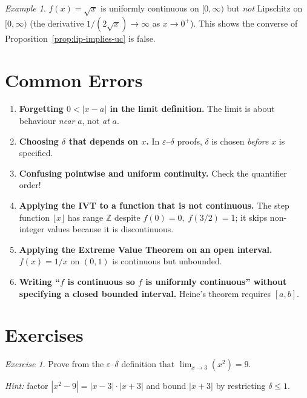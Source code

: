 \documentclass[12pt,a4paper,openany]{book}
\theoremstyle{definition}
\theoremstyle{remark}
\newtheorem{example}{Example}[chapter]
\newtheorem{exercise}{Exercise}[chapter]
\begin{document}
\begin{example}
$f(x)=\sqrt{x}$ is uniformly continuous on $[0,\infty)$ but \emph{not}
Lipschitz on $[0,\infty)$ (the derivative $1/(2\sqrt{x})\to\infty$ as
$x\to 0^+$).  This shows the converse of
Proposition~\ref{prop:lip-implies-uc} is false.
\end{example}

\section{Common Errors}

\begin{tcolorbox}[colback=red!4,colframe=red!70!black,
  title={Frequent mistakes in Chapter~5}]
\begin{enumerate}[nosep]
\item \textbf{Forgetting $0<|x-a|$ in the limit definition.}\;
  The limit is about behaviour \emph{near} $a$, not \emph{at} $a$.
\item \textbf{Choosing $\delta$ that depends on $x$.}\;
  In $\varepsilon$--$\delta$ proofs, $\delta$ is chosen \emph{before}
  $x$ is specified.
\item \textbf{Confusing pointwise and uniform continuity.}\;
  Check the quantifier order!
\item \textbf{Applying the IVT to a function that is not continuous.}\;
  The step function $\lfloor x\rfloor$ has range $\mathbb{Z}$ despite
  $f(0)=0,\;f(3/2)=1$; it skips non-integer values because it is
  discontinuous.
\item \textbf{Applying the Extreme Value Theorem on an open interval.}\;
  $f(x)=1/x$ on $(0,1)$ is continuous but unbounded.
\item \textbf{Writing ``$f$ is continuous so $f$ is uniformly
  continuous'' without specifying a closed bounded interval.}\;
  Heine's theorem requires $[a,b]$.
\end{enumerate}
\end{tcolorbox}

\section{Exercises}

\begin{exercise}\label{exo:ch5-1}
Prove from the $\varepsilon$--$\delta$ definition that
$\displaystyle\lim_{x\to 3}(x^2)=9$.

\emph{Hint:} factor $|x^2-9|=|x-3|\cdot|x+3|$ and bound $|x+3|$
by restricting $\delta\le 1$.
\end{exercise}
\end{document}

